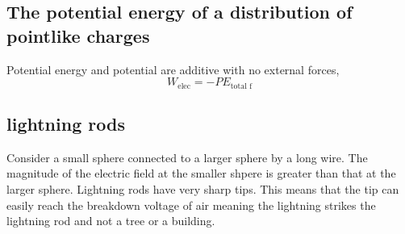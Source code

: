 \documentclass[twocolumn]{article}
\begin{document}
\subsection{The potential energy of a distribution of pointlike charges}
\begin{outline}
	\1 Potential energy and potential are additive
	\1 with no external forces, \[W_{\text{elec}}=-PE_{\text{total f}}\]
\end{outline}
\subsection{lightning rods}
\begin{outline}
	\1 Consider a small sphere connected to a larger sphere by a long wire. The magnitude of the electric field at the smaller shpere is greater than that at the larger sphere. 
	\1 Lightning rods have very sharp tips. This means that the tip can easily reach the breakdown voltage of air meaning the lightning strikes the lightning rod and not a tree or a building. 
\end{outline}
\end{document}
